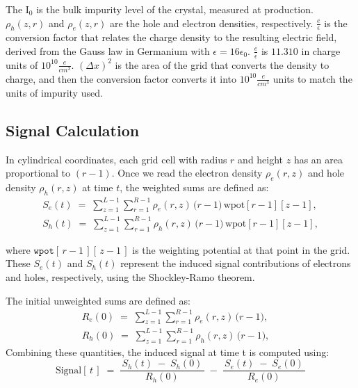 \noindent
The $\text{I}_{0}$ is the bulk impurity level of the crystal, measured at production. $\rho_h(z,r)$ and $\rho_e(z,r)$ are the hole and electron densities, respectively. $\frac{e}{\epsilon}$ is the conversion factor that relates the charge density to the resulting electric field, derived from the Gauss law in Germanium with $\epsilon = 16\epsilon_0$. $\frac{e}{\epsilon}$ is $11.310$ in
charge units of $10^{10}\frac{e}{cm^3}$. $(\Delta x)^2$ is the area of the grid that converts the density to charge, and then the conversion factor converts it into $10^{10}\frac{e}{cm^3}$ units to match the units of impurity used.

\subsection{Signal Calculation}

In cylindrical coordinates, each grid cell with radius $r$ and height $z$ has an area proportional to $(r - 1)$. Once we read the electron 
density $\rho_e(r,z)$ and hole density $\rho_h(r,z)$ at time $t$, the weighted sums are defined as:
\begin{align}
S_e(t) \;=\; \sum_{z=1}^{L-1} \sum_{r=1}^{R-1}
   \rho_e(r,z)\,\bigl(r-1\bigr)\,\text{wpot}[r-1][z-1],\\
S_h(t) \;=\; \sum_{z=1}^{L-1} \sum_{r=1}^{R-1}
   \rho_h(r,z)\,\bigl(r-1\bigr)\,\text{wpot}[r-1][z-1],
\end{align}

\noindent
where \(\texttt{wpot}[\,r-1\,][\,z-1\,]\) is the weighting potential at that point in the grid. These $S_e(t)$ and $S_h(t)$ represent the induced signal contributions of electrons and holes, respectively, using the Shockley-Ramo theorem.

The initial unweighted sums are defined as:
\begin{align}
R_{e}(0) \;=\; \sum_{z=1}^{L-1} \sum_{r=1}^{R-1}
   \rho_e(r,z)\,\bigl(r-1\bigr), \quad \\
R_{h}(0) \;=\; \sum_{z=1}^{L-1} \sum_{r=1}^{R-1}
   \rho_h(r,z)\,\bigl(r-1\bigr), \quad
\end{align}
\noindent
Combining these quantities, the induced signal at time t is computed using:
\begin{equation}
\text{Signal}[\,t\,] 
\;=\;
  \frac{\,S_h(t)\;-\;S_h(0)\,}{\,R_{h}(0)\,}
  \;-\;
  \frac{\,S_e(t)\;-\;S_e(0)\,}{\,R_{e}(0)\,}
\label{eq:net-signal}
\end{equation}

